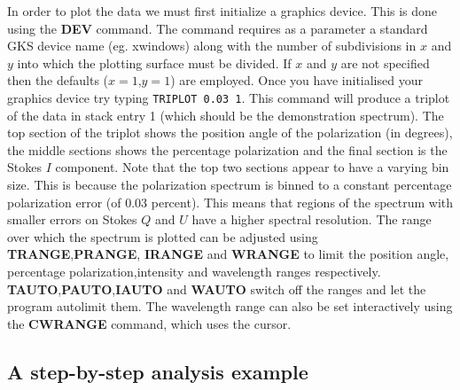 In order to plot the data we must first initialize a graphics
device. This is done using the {\bf DEV} command. The command requires
as a parameter a standard GKS device name (eg. xwindows) along with
the number of subdivisions in $x$ and $y$ into which the plotting
surface must be divided. If $x$ and $y$ are not specified then the
defaults ($x=1$,$y=1$) are employed. Once you have initialised your
graphics device try typing {\tt TRIPLOT 0.03 1}. This command will
produce a triplot of the data in stack entry 1 (which should be the
demonstration spectrum). The top section of the triplot shows the
position angle of the polarization (in degrees), the middle sections
shows the percentage polarization and the final section is the Stokes
$I$ component. Note that the top two sections appear to have a varying
bin size. This is because the polarization spectrum is binned to a
constant percentage polarization error (of 0.03 percent). This means
that regions of the spectrum with smaller errors on Stokes $Q$ and $U$
have a higher spectral resolution. The range over which the spectrum
is plotted can be adjusted using {\bf TRANGE},{\bf PRANGE},{\bf
IRANGE} and {\bf WRANGE} to limit the position angle, percentage
polarization,intensity and wavelength ranges respectively. {\bf
TAUTO},{\bf PAUTO},{\bf IAUTO} and {\bf WAUTO} switch off the ranges
and let the program autolimit them. The wavelength range can also be
set interactively using the {\bf CWRANGE} command, which uses the
cursor.

\subsection{A step-by-step analysis example}

